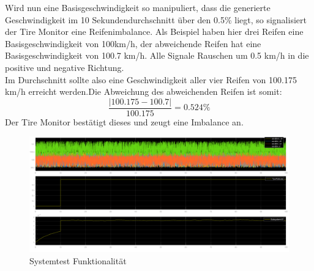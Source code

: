 Wird nun eine Basisgeschwindigkeit so manipuliert, dass die generierte Geschwindigkeit im 10 Sekundendurchschnitt über den 0.5\% liegt, so signalisiert der Tire Monitor eine Reifenimbalance. Als Beispiel haben hier drei Reifen eine Basisgeschwindigkeit von 100km/h, der abweichende Reifen hat eine Basisgeschwindigkeit von 100.7 km/h. Alle Signale Rauschen um 0.5 km/h in die positive und negative Richtung.\\
Im Durchschnitt sollte also eine Geschwindigkeit aller vier Reifen von 100.175 km/h erreicht werden.Die Abweichung des abweichenden Reifen ist somit:
$$
\dfrac{|100.175-100.7|}{100.175} = 0.524\%
$$
Der Tire Monitor bestätigt dieses und zeugt eine Imbalance an.
\begin{figure}[H]
	\centering
	\includegraphics[width=0.95\linewidth]{../Graphiken/RandomAbweichung}
	\caption{Systemtest Funktionalität}
	\label{fig:funkt}
\end{figure}
